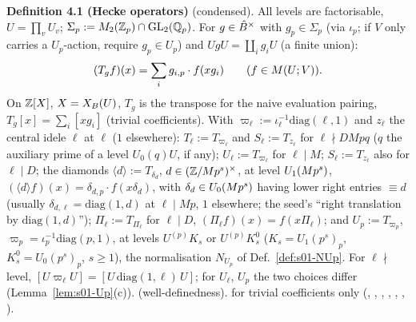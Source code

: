 \medskip
\noindent{}\label{rpt:def:s01-hecke}\textbf{Definition 4.1 (Hecke operators)} (condensed).
All levels are factorisable, $U=\prod_vU_v$; $\Sigma_p:=M_2(\mathbb{Z}_p)\cap\mathrm{GL}_2(\mathbb{Q}_p)$. For $g\in\hat{B}^\times$ with $g_p\in\Sigma_p$ (via $\iota_p$; if
$V$ only carries a $U_p$-action, require $g_p\in U_p$) and $UgU=\coprod_ig_iU$ (a finite union):
\[(T_gf)(x)=\sum_ig_{i,p}\cdot f(xg_i)\qquad(f\in M(U;V)).\]
On $\mathbb{Z}[X]$, $X=X_B(U)$, $T_g$ is the transpose for the naive evaluation pairing, $T_g[x]=\sum_i[xg_i]$ (trivial coefficients).
With $\varpi_\ell:=\iota_\ell^{-1}\mathrm{diag}(\ell,1)$ and $z_\ell$ the central idele $\ell$ at $\ell$ ($1$ elsewhere):
$T_\ell:=T_{\varpi_\ell}$ and $S_\ell:=T_{z_\ell}$ for $\ell\nmid DMpq$ ($q$ the auxiliary prime of a level $U_0(q)U$, if any);
$U_\ell:=T_{\varpi_\ell}$ for $\ell\mid M$; $S_\ell:=T_{z_\ell}$ also for $\ell\mid D$;
the diamonds $\langle d\rangle:=T_{\delta_d}$, $d\in(\mathbb{Z}/Mp^s)^\times$, at level $U_1(Mp^s)$, $(\langle d\rangle f)(x)=\delta_{d,p}\cdot f(x\delta_d)$,
with $\delta_d\in U_0(Mp^s)$ having lower right entries $\equiv d$ (usually $\delta_{d,\ell}=\mathrm{diag}(1,d)$ at $\ell\mid Mp$, $1$ elsewhere;
the seed's ``right translation by $\mathrm{diag}(1,d)$'');
$\Pi_\ell:=T_{\Pi_\ell}$ for $\ell\mid D$, $(\Pi_\ell f)(x)=f(x\Pi_\ell)$;
and $U_p:=T_{\varpi_p}$, $\varpi_p=\iota_p^{-1}\mathrm{diag}(p,1)$, at levels $U^{(p)}K_s$ or $U^{(p)}K^0_s$ ($K_s=U_1(p^s)_p$, $K^0_s=U_0(p^s)_p$, $s\ge1$),
the normalisation $N_{U_p}$ of Def.~\ref{def:s01-NUp}.
For $\ell\nmid$ level, $[U\varpi_\ell U]=[U\,\mathrm{diag}(1,\ell)\,U]$; for $U_\ell$, $U_p$ the two choices differ (Lemma~\ref{lem:s01-Up}(c)).
\stproved{} (well-definedness). \stformal{} for trivial coefficients only (, ,
, , , ,
).

